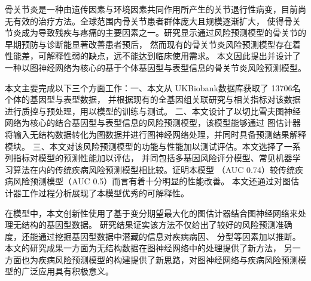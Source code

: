 
\clearpage
\titlespacing{\chapter}{0pt}{0mm}{5mm}



骨关节炎是一种由遗传因素与环境因素共同作用所产生的关节退行性病变，目前尚无有效的治疗方法。全球范围内骨关节患者群体庞大且规模逐渐扩大，
使得骨关节炎成为导致残疾与疼痛的主要因素之一。研究显示通过风险预测模型的骨关节的早期预防与诊断能显著改善患者预后，
然而现有的骨关节炎风险预测模型存在着性能差，可解释性弱的缺点，远不能达到临床使用需求。
本文因此提出并设计了一种以图神经网络为核心的基于个体基因型与表型信息的骨关节炎风险预测模型。

本文主要完成以下三个方面工作：一、本文从 UKBiobank数据库获取了 13706名个体的基因型与表型数据，
并根据现有的全基因组关联研究与相关指标对该数据进行质控与预处理，用以模型的训练与测试。
二、本文设计了以切比雪夫图神经网络为核心的结合基因型与表型信息的风险预测模型，该模型能够通过
图估计器将输入无结构数据转化为图数据并进行图神经网络处理，并同时具备预测结果解释模块。
三、本文对该风险预测模型的功能与性能加以测试评估。本文选择了一系列指标对模型的预测性能加以评估，
并同包括多基因风险评分模型、常见机器学习算法在内的传统疾病风险预测模型相比较。证明本模型
（AUC 0.74）较传统疾病风险预测模型（AUC 0.5）而言有着十分明显的性能改善。
本文还通过对图估计器工作过程分析展现了本模型优秀的可解释性。

在模型中，本文创新性使用了基于变分期望最大化的图估计器结合图神经网络来处理无结构的基因型数据。
研究结果证实该方法不仅给出了较好的风险预测准确度，还能通过挖掘基因型数据中潜藏的信息对疾病病因、
分型等因素加以推断。本文的研究成果一方面为无结构数据在图神经网络中的处理提供了新方法，
另一方面也为疾病风险预测模型的构建提供了新思路，对图神经网络与疾病风险预测模型的广泛应用具有积极意义。



\vspace{\baselineskip}



\clearpage
{}

